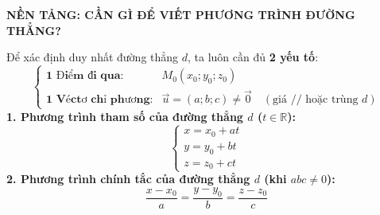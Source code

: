 \documentclass[12pt,a4paper]{article}
\begin{document}

\vspace{-0.25cm}

\begin{theorybox}
    \textbf{\textcolor{deepblue}{\faLightbulb\hskip 6pt NỀN TẢNG: CẦN GÌ ĐỂ VIẾT PHƯƠNG TRÌNH ĐƯỜNG THẲNG?}}
    \par\vspace{4pt}
    \begin{minipage}[c]{0.65\linewidth}
        Để xác định duy nhất đường thẳng $d$, ta luôn cần đủ \textbf{2 yếu tố}:
        \[
            \begin{cases} 
                \textbf{1 Điểm đi qua:} & M_0(x_0; y_0; z_0) \\ 
                \textbf{1 Véctơ chỉ phương:} & \vec{u} = (a; b; c) \neq \vec{0} \quad (\text{giá } /\!/ \text{ hoặc trùng } d)
            \end{cases}
        \]
        \textbf{1. Phương trình tham số của đường thẳng $d$ ($t \in \mathbb{R}$):}
        \[
            \begin{cases} x = x_0 + at \\ y = y_0 + bt \\ z = z_0 + ct \end{cases}
        \]
        \textbf{2. Phương trình chính tắc của đường thẳng $d$ (khi $abc \neq 0$):}
        \[
            \dfrac{x - x_0}{a} = \dfrac{y - y_0}{b} = \dfrac{z - z_0}{c}
        \]
    \end{minipage}%
    \hfill
    \begin{minipage}[c]{0.32\linewidth}
        \centering
    \end{minipage}
\end{theorybox}
\end{document}
